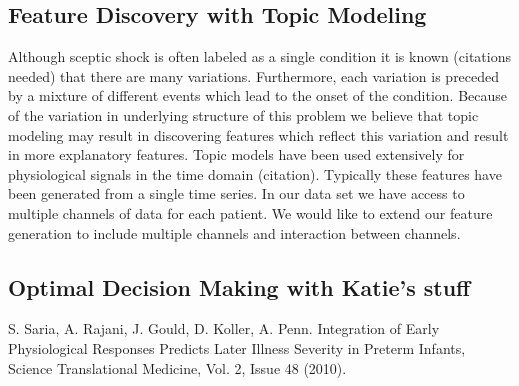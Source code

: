 \documentclass[dvips,12pt]{article}
\begin{document}
\subsection{Feature Discovery with Topic Modeling}

Although sceptic shock is often labeled as a single condition it is known (citations needed) that there are many variations. 
Furthermore, each variation is preceded by a mixture of different events which lead to the onset of the condition. Because of the variation in underlying structure
of this problem we believe that topic modeling may result in discovering features which reflect this variation and result in more explanatory features. Topic models have been used extensively for physiological signals in the time domain (citation). Typically these features have been generated from a single time series. In our data set we have access to multiple channels of data for each patient. We would like to extend our feature generation to include multiple channels and interaction between channels. 

\subsection{Optimal Decision Making with Katie's stuff}
\begin{thebibliography}{99}
 S. Saria, 
A. Rajani, 
J. Gould, 
D. Koller, 
A. Penn. 
{Integration of Early Physiological Responses Predicts Later Illness Severity in Preterm Infants},
Science Translational Medicine, Vol. 2, Issue 48 (2010).

\end{thebibliography}
\end{document}
